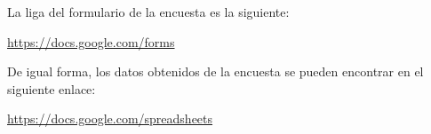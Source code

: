La liga del formulario de la encuesta es la siguiente:

\href{https://docs.google.com/forms/d/e/1FAIpQLSdfd8M47h6zGO0fvDssPWbrZuEOm20FJ3ss8eDwVc7oTqu6cw/viewform?usp=sharing&ouid=106794449610082366755}{https://docs.google.com/forms}

De igual forma, los datos obtenidos de la encuesta se pueden encontrar en el siguiente enlace:

\href{https://docs.google.com/spreadsheets/d/1R1GYywLJYwzJIxbg2SXk501dDjIcelsgJNE-JNwAGOg/edit?usp=sharing}{https://docs.google.com/spreadsheets}